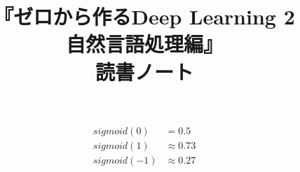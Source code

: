 \documentclass[uplatex,dvipdfmx]{jsarticle} \usepackage{amsmath,amssymb,bm}
\title{『ゼロから作るDeep Learning 2\\自然言語処理編』\\読書ノート} \author{} \date{}
\begin{document}
\maketitle
\begin{align*}
sigmoid(0) &= 0.5 \\
sigmoid(1) &\approx 0.73\\
sigmoid(-1) &\approx 0.27
\end{align*}



\vspace{\baselineskip}
\begin{paracol}{2}
\switchcolumn
\end{paracol}
\end{document}
